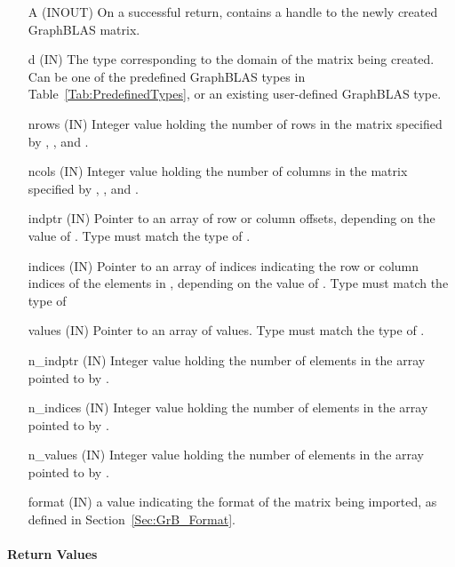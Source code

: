\begin{itemize}[leftmargin=1.1in]
    \item[{\sf A}]      ({\sf INOUT}) On a successful return, contains a handle to the newly created GraphBLAS matrix.
    \item[{\sf d}] ({\sf IN})    The type corresponding to the domain of the matrix 
                                 being created. Can be one of the predefined
                                 GraphBLAS types in Table~\ref{Tab:PredefinedTypes}, 
                                 or an existing user-defined GraphBLAS type.
    \item[{\sf nrows}] ({\sf IN}) Integer value holding the number of rows in the matrix specified by , , and .
    \item[{\sf ncols}] ({\sf IN}) Integer value holding the number of columns in the matrix specified by , , and .
    \item[{\sf indptr}] ({\sf IN}) Pointer to an array of row or column offsets, depending on the value of .  Type must match the type of .
    \item[{\sf indices}] ({\sf IN}) Pointer to an array of indices indicating the row or column indices of the elements in , depending on the value of .  Type must match the type of 
    \item[{\sf values}] ({\sf IN}) Pointer to an array of values.  Type must match the type of .
    \item[{\sf n\_indptr}] ({\sf IN}) Integer value holding the number of elements in the array pointed to by .
    \item[{\sf n\_indices}] ({\sf IN}) Integer value holding the number of elements in the array pointed to by .
    \item[{\sf n\_values}] ({\sf IN}) Integer value holding the number of elements in the array pointed to by .
    \item[{\sf format}] ({\sf IN}) a value indicating the format of the matrix being imported, as defined in Section~\ref{Sec:GrB_Format}.
\end{itemize}

\paragraph{Return Values}

